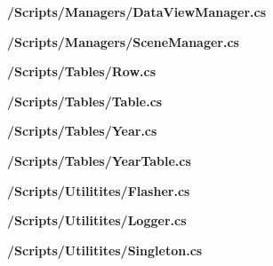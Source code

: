 \textbf{/Scripts/Managers/DataViewManager.cs}


\textbf{/Scripts/Managers/SceneManager.cs}


\textbf{/Scripts/Tables/Row.cs}


\textbf{/Scripts/Tables/Table.cs}


\textbf{/Scripts/Tables/Year.cs}


\textbf{/Scripts/Tables/YearTable.cs}


\textbf{/Scripts/Utilitites/Flasher.cs}


\textbf{/Scripts/Utilitites/Logger.cs}


\textbf{/Scripts/Utilitites/Singleton.cs}



